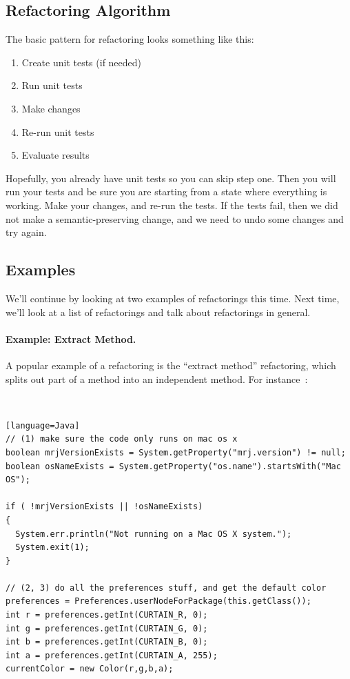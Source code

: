 \subsection*{Refactoring Algorithm}
The basic pattern for refactoring looks something like this:

\begin{enumerate}
	\item Create unit tests (if needed)
	\item Run unit tests
	\item Make changes
	\item Re-run unit tests
	\item Evaluate results
\end{enumerate}

Hopefully, you already have unit tests so you can skip step one. Then you will run your tests and be sure you are starting from a state where everything is working. Make your changes, and re-run the tests. If the tests fail, then we did not make a semantic-preserving change, and we need to undo some changes and try again.


\subsection*{Examples}
We'll continue by looking at two examples of refactorings this time.
Next time, we'll look at a list of refactorings and talk about refactorings in
general.

\paragraph{Example: Extract Method.} A popular example of a refactoring
is the ``extract method'' refactoring, which splits out part of a
method into an independent method. For instance~\cite{ref:extmeth}:

{\tt
\begin{verbatim}[language=Java]
// (1) make sure the code only runs on mac os x
boolean mrjVersionExists = System.getProperty("mrj.version") != null;
boolean osNameExists = System.getProperty("os.name").startsWith("Mac OS");

if ( !mrjVersionExists || !osNameExists)
{
  System.err.println("Not running on a Mac OS X system.");
  System.exit(1);
}

// (2, 3) do all the preferences stuff, and get the default color
preferences = Preferences.userNodeForPackage(this.getClass());
int r = preferences.getInt(CURTAIN_R, 0);
int g = preferences.getInt(CURTAIN_G, 0);
int b = preferences.getInt(CURTAIN_B, 0);
int a = preferences.getInt(CURTAIN_A, 255);
currentColor = new Color(r,g,b,a);
\end{verbatim}
}

